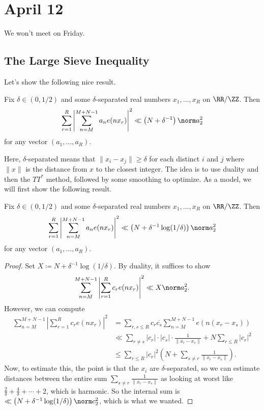 \documentclass[../notes.tex]{subfiles}
\begin{document}
\section{April 12}

We won't meet on Friday.

\subsection{The Large Sieve Inequality}
Let's show the following nice result.
\begin{theorem} \label{thm:large-sieve-ineq}
	Fix $\delta\in(0,1/2)$ and some $\delta$-separated real numbers $x_1,\ldots,x_R$ on $\RR/\ZZ$. Then
	\[\sum_{r=1}^R\left|\sum_{n=M}^{M+N-1}a_ne(nx_r)\right|^2\ll\left(N+\delta^{-1}\right)\norm a_2^2\]
	for any vector $(a_1,\ldots,a_R)$.
\end{theorem}
Here, $\delta$-separated means that $\lVert x_i-x_j\rVert\ge\delta$ for each distinct $i$ and $j$ where $\lVert x\rVert$ is the distance from $x$ to the closest integer. The idea is to use duality and then the $TT^*$ method, followed by some smoothing to optimize. As a model, we will first show the following result.
\begin{proposition}
	Fix $\delta\in(0,1/2)$ and some $\delta$-separated real numbers $x_1,\ldots,x_R$ on $\RR/\ZZ$. Then
	\[\sum_{r=1}^R\left|\sum_{n=M}^{M+N-1}a_ne(nx_r)\right|^2\ll\left(N+\delta^{-1}\log(1/\delta)\right)\norm a_2^2\]
	for any vector $(a_1,\ldots,a_R)$.
\end{proposition}
\begin{proof}
	Set $X\coloneqq N+\delta^{-1}\log(1/\delta)$. By duality, it suffices to show
	\[\sum_{n=M}^{M+N-1}\left|\sum_{r=1}^Rc_re(nx_r)\right|^2\ll X\norm a_2^2.\]
	However, we can compute
	\begin{align*}
		\sum_{n=M}^{M+N-1}\left|\sum_{r=1}^Rc_re(nx_r)\right|^2 &= \sum_{r,s\le R}c_r\overline{c_s}\sum_{n=M}^{M+N-1}e(n(x_r-x_s)) \\
		&\ll \sum_{r\ne s}|c_r|\cdot|c_s|\cdot\frac1{\lVert x_r-x_s\rVert}+N\sum_{r\le R}|c_r|^2 \\
		&\le \sum_{r\le R}|c_r|^2\left(N+\sum_{s\ne r}\frac1{\lVert x_r-x_s\rVert}\right).
	\end{align*}
	Now, to estimate this, the point is that the $x_i$ are $\delta$-separated, so we can estimate distances between the entire sum $\sum_{s\ne r}\frac1{\lVert x_r-x_s\rVert}$ as looking at worst like $\frac2\delta+\frac4\delta+\cdots+2$, which is harmonic. So the internal sum is $\ll\left(N+\delta^{-1}\log(1/\delta)\right)\norm c_2^2$, which is what we wanted.
\end{proof}
\end{document}
